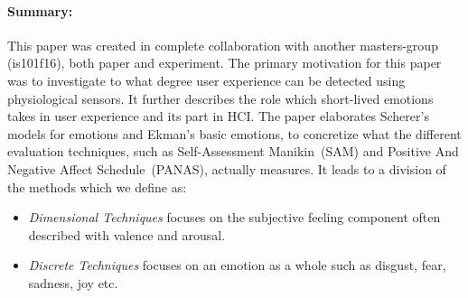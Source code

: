 \paragraph{Summary:}

This paper was created in complete collaboration with another masters-group (is101f16), both paper and experiment.
The primary motivation for this paper was to investigate to what degree user experience can be detected using physiological sensors.
It further describes the role which short-lived emotions takes in user experience and its part in HCI.
The paper elaborates Scherer's\cite{definition_emotions} models for emotions and Ekman's basic emotions\cite{basic_emotion_origin}, to concretize what the different evaluation techniques, such as Self-Assessment Manikin~(SAM) and Positive And Negative Affect Schedule~(PANAS)\cite{PANAS}, actually measures. It leads to a division of the methods which we define as:
\begin{itemize}
\item \textit{Dimensional Techniques} focuses on the subjective feeling component often described with valence and arousal.
\item \textit{Discrete Techniques} focuses on an emotion as a whole such as disgust, fear, sadness, joy etc.
\end{itemize}
